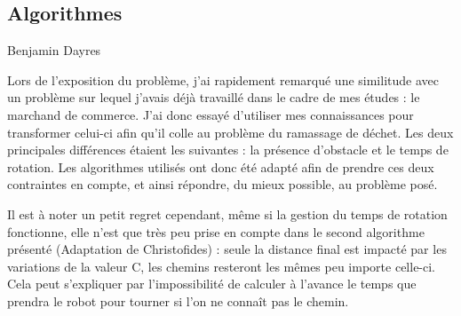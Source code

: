 \documentclass{article}
\begin{document}
\subsection{Algorithmes}
Benjamin Dayres

Lors de l'exposition du problème, j'ai rapidement remarqué une similitude avec un problème sur lequel j'avais déjà travaillé dans le cadre de mes études : le marchand de commerce.
J'ai donc essayé d'utiliser mes connaissances pour transformer celui-ci afin qu'il colle au problème du ramassage de déchet. Les deux principales différences étaient les suivantes : la présence d'obstacle et le temps de rotation.
Les algorithmes utilisés ont donc été adapté afin de prendre ces deux contraintes en compte, et ainsi répondre, du mieux possible, au problème posé. \newline

Il est à noter un petit regret cependant, même si la gestion du temps de rotation fonctionne, elle n'est que très peu prise en compte dans le second algorithme présenté (Adaptation de Christofides) : seule la distance final est impacté par les variations de la valeur C, les chemins resteront les mêmes peu importe celle-ci. Cela peut s'expliquer par l'impossibilité de calculer à l'avance le temps que prendra le robot pour tourner si l'on ne connaît pas le chemin.
\end{document}
